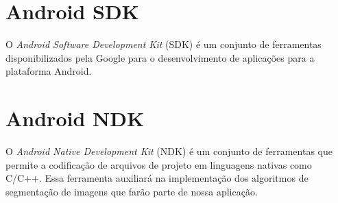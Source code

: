 \section{Android SDK}\label{sec:sdk}
O \textit{Android Software Development Kit} (SDK) é um conjunto de ferramentas disponibilizados pela Google para o desenvolvimento de aplicações para a plataforma Android.

\section{Android NDK}
O \textit{Android Native Development Kit} (NDK) é um conjunto de ferramentas que permite a codificação de arquivos de projeto em linguagens nativas como C/C++. Essa ferramenta auxiliará na implementação dos algoritmos de segmentação de imagens que farão parte de nossa aplicação. \citep{ndk}

